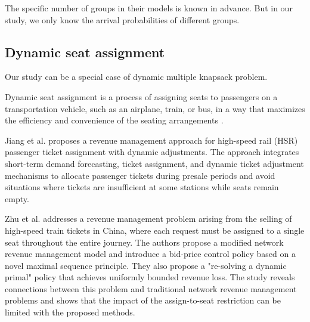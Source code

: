 The specific number of groups in their models is known in advance. But in our study, we only know the arrival probabilities of different groups.










\subsection{Dynamic seat assignment}
Our study can be a special case of dynamic multiple knapsack problem.

Dynamic seat assignment is a process of assigning seats to passengers on a transportation vehicle, such as an airplane, train, or bus, in a way that maximizes the efficiency and convenience of the seating arrangements \cite{hamdouch2011schedule, berge1993demand}. 

Jiang et al. \cite{jiang2015dynamic} proposes a revenue management approach for high-speed rail (HSR) passenger ticket assignment with dynamic adjustments. The approach integrates short-term demand forecasting, ticket assignment, and dynamic ticket adjustment mechanisms to allocate passenger tickets during presale periods and avoid situations where tickets are insufficient at some stations while seats remain empty.


Zhu et al. \cite{zhu2023assign} addresses a revenue management problem arising from the selling of high-speed train tickets in China, where each request must be assigned to a single seat throughout the entire journey. The authors propose a modified network revenue management model and introduce a bid-price control policy based on a novel maximal sequence principle. They also propose a "re-solving a dynamic primal" policy that achieves uniformly bounded revenue loss. The study reveals connections between this problem and traditional network revenue management problems and shows that the impact of the assign-to-seat restriction can be limited with the proposed methods.


